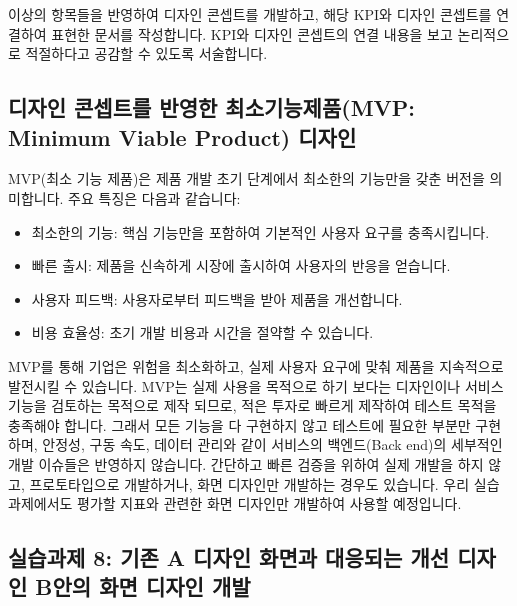 \documentclass[
  letterpaper,
]{book}
\providecommand{\tightlist}{%
  \setlength{\itemsep}{0pt}\setlength{\parskip}{0pt}}\usepackage{longtable,booktabs,array}
\begin{document}
이상의 항목들을 반영하여 디자인 콘셉트를 개발하고, 해당 KPI와 디자인
콘셉트를 연결하여 표현한 문서를 작성합니다. KPI와 디자인 콘셉트의 연결
내용을 보고 논리적으로 적절하다고 공감할 수 있도록 서술합니다.

\subsection{디자인 콘셉트를 반영한 최소기능제품(MVP: Minimum Viable
Product)
디자인}\label{uxb514uxc790uxc778-uxcf58uxc149uxd2b8uxb97c-uxbc18uxc601uxd55c-uxcd5cuxc18cuxae30uxb2a5uxc81cuxd488mvp-minimum-viable-product-uxb514uxc790uxc778}

MVP(최소 기능 제품)은 제품 개발 초기 단계에서 최소한의 기능만을 갖춘
버전을 의미합니다. 주요 특징은 다음과 같습니다:

\begin{itemize}
\tightlist
\item
  최소한의 기능: 핵심 기능만을 포함하여 기본적인 사용자 요구를
  충족시킵니다.
\item
  빠른 출시: 제품을 신속하게 시장에 출시하여 사용자의 반응을 얻습니다.
\item
  사용자 피드백: 사용자로부터 피드백을 받아 제품을 개선합니다.
\item
  비용 효율성: 초기 개발 비용과 시간을 절약할 수 있습니다.
\end{itemize}

MVP를 통해 기업은 위험을 최소화하고, 실제 사용자 요구에 맞춰 제품을
지속적으로 발전시킬 수 있습니다. MVP는 실제 사용을 목적으로 하기 보다는
디자인이나 서비스 기능을 검토하는 목적으로 제작 되므로, 적은 투자로
빠르게 제작하여 테스트 목적을 충족해야 합니다. 그래서 모든 기능을 다
구현하지 않고 테스트에 필요한 부분만 구현하며, 안정성, 구동 속도, 데이터
관리와 같이 서비스의 백엔드(Back end)의 세부적인 개발 이슈들은 반영하지
않습니다. 간단하고 빠른 검증을 위하여 실제 개발을 하지 않고,
프로토타입으로 개발하거나, 화면 디자인만 개발하는 경우도 있습니다. 우리
실습 과제에서도 평가할 지표와 관련한 화면 디자인만 개발하여 사용할
예정입니다.

\subsection{실습과제 8: 기존 A 디자인 화면과 대응되는 개선 디자인 B안의
화면 디자인
개발}\label{uxc2e4uxc2b5uxacfcuxc81c-8-uxae30uxc874-a-uxb514uxc790uxc778-uxd654uxba74uxacfc-uxb300uxc751uxb418uxb294-uxac1cuxc120-uxb514uxc790uxc778-buxc548uxc758-uxd654uxba74-uxb514uxc790uxc778-uxac1cuxbc1c}
\end{document}

